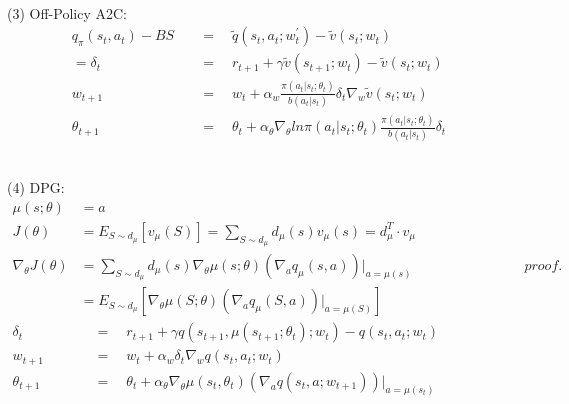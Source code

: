 \documentclass{article}
\begin{document}
~ \\[3pt]
(3) Off-Policy A2C: 
\begin{align*}
    q_{\pi}(s_{t}, a_{t}) - BS & 
            \quad = \quad 
            \tilde{q}(s_{t}, a_{t}; w_{t}^{'}) 
            - \tilde{v}(s_{t}; w_{t}) \\[3pt]
    = \delta_{t} & 
            \quad = \quad 
            r_{t+1} + \gamma \tilde{v}(s_{t+1}; w_{t}) 
            - \tilde{v}(s_{t}; w_{t}) \\[3pt]
    w_{t+1} & 
            \quad = \quad w_{t} + \alpha_{w} 
            \frac{ \pi (a_{t} | s_{t}; \theta_{t}) }{ b (a_{t} | s_{t}) } \delta_{t} 
            \nabla_{w} \tilde{v}(s_{t}; w_{t}) \\[3pt]
    \theta_{t+1} & 
            \quad = \quad \theta_{t} + \alpha_{\theta} \nabla_{\theta} 
            ln \pi (a_{t} | s_{t}; \theta_{t}) 
            \frac{ \pi (a_{t} | s_{t}; \theta_{t}) }{ b (a_{t} | s_{t}) } \delta_{t} 
\end{align*}


~ \\[3pt]
(4) DPG: 
\begin{align*}
    \mu (s; \theta) &= a \\[3pt]
    J(\theta) &= E_{S \sim d_{\mu}} [ v_{\mu}(S) ] 
               = \sum_{S \sim d_{\mu}} d_{\mu}(s) v_{\mu}(s) 
               = d_{\mu}^{T} \cdot v_{\mu} \\[3pt]
    \nabla_{\theta} J(\theta) &= 
            \sum_{S \sim d_{\mu}} d_{\mu}(s) 
            \nabla_{\theta} \mu (s; \theta) 
            \left( \nabla_{a} q_{\mu}(s, a) \right) |_{a=\mu(s)} 
            \qquad \qquad \qquad \qquad proof. \\[3pt]
            &= 
            E_{S \sim d_{\mu}} \left[ 
                \nabla_{\theta} \mu (S; \theta) 
                \left( \nabla_{a} q_{\mu}(S, a) \right) |_{a=\mu(S)} 
            \right] \\[3pt]
    \delta_{t} & 
            \quad = \quad 
            r_{t+1} + \gamma q(s_{t+1}, \mu(s_{t+1}; \theta_{t}); w_{t}) 
            - q(s_{t}, a_{t}; w_{t}) \\[3pt]
    w_{t+1} & 
            \quad = \quad w_{t} + \alpha_{w} \delta_{t} 
            \nabla_{w} q(s_{t}, a_{t}; w_{t}) \\[3pt]
    \theta_{t+1} & 
            \quad = \quad \theta_{t} + \alpha_{\theta} \nabla_{\theta} 
            \mu(s_{t}, \theta_{t}) \left(
                \nabla_{a}q(s_{t}, a; w_{t+1}) 
            \right) |_{a=\mu(s_{t})} 
\end{align*}
\end{document}
